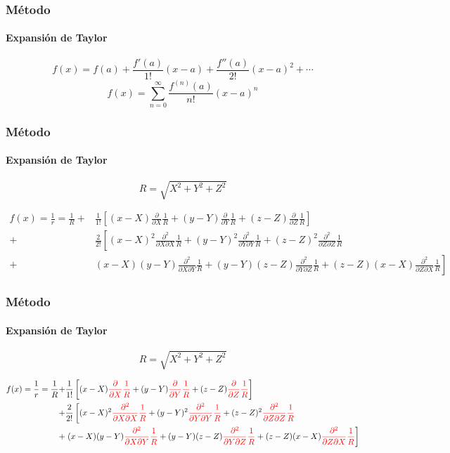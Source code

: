 \begin{frame}
    \frametitle{Método}
    \framesubtitle{Expansión de Taylor}

    $$f(x) = f(a) + \frac{f'(a)}{1!} (x-a)+\frac{f''(a)}{2!} (x-a)^{2} + \cdots$$
    $$f(x) = \sum_{n=0}^{\infty} \frac{f^{(n)}(a)}{n!} (x-a)^{n}$$
    
\end{frame}

\begin{frame}
    \frametitle{Método}
    \framesubtitle{Expansión de Taylor}
    \tiny
    $$R = \sqrt{X^{2} + Y^{2} + Z^{2}}$$

    \begin{equation}
    \begin{split}
    f(x) = \frac{1}{r} = \frac{1}{R} +& \frac{1}{1!} \left[ (x-X)\frac{\partial}{\partial X} \frac{1}{R} + (y-Y)\frac{\partial}{\partial Y} \frac{1}{R} +(z-Z)\frac{\partial}{\partial Z} \frac{1}{R} \right] \\
                                     +& \frac{2}{2!} \left[ (x-X)^{2}\frac{\partial^{2}}{\partial X \partial X} \frac{1}{R} + (y-Y)^{2}\frac{\partial^{2}}{\partial Y\partial Y} \frac{1}{R} +(z-Z)^{2}\frac{\partial^{2}}{\partial Z\partial Z} \frac{1}{R} \right. \nonumber \\
                                     +& \left.(x-X)(y-Y) \frac{\partial^{2}}{\partial X \partial Y} \frac{1}{R} + (y-Y)(z-Z)\frac{\partial^{2}}{\partial Y\partial Z} \frac{1}{R} + (z-Z)(x-X)\frac{\partial^{2}}{\partial Z \partial X} \frac{1}{R} \right]
    \end{split}
    \end{equation}
\end{frame}

\begin{frame}
    \frametitle{Método}
    \framesubtitle{Expansión de Taylor}
    \tiny
    $$R = \sqrt{X^{2} + Y^{2} + Z^{2}}$$

    \begin{equation}
    \begin{split}
    f(x) = \frac{1}{r} = \frac{1}{R} +& \frac{1}{1!} \left[ (x-X)\textcolor{red}{\frac{\partial}{\partial X} \frac{1}{R}} + (y-Y)\textcolor{red}{\frac{\partial}{\partial Y} \frac{1}{R}} +(z-Z)\textcolor{red}{\frac{\partial}{\partial Z} \frac{1}{R}} \right] \\
                                     +& \frac{2}{2!} \left[ (x-X)^{2}\textcolor{red}{\frac{\partial^{2}}{\partial X \partial X} \frac{1}{R}} + (y-Y)^{2}\textcolor{red}{\frac{\partial^{2}}{\partial Y\partial Y} \frac{1}{R}} +(z-Z)^{2}\textcolor{red}{\frac{\partial^{2}}{\partial Z\partial Z} \frac{1}{R}} \right. \nonumber \\
                                     +& \left.(x-X)(y-Y) \textcolor{red}{\frac{\partial^{2}}{\partial X \partial Y} \frac{1}{R}} + (y-Y)(z-Z)\textcolor{red}{\frac{\partial^{2}}{\partial Y\partial Z} \frac{1}{R}} + (z-Z)(x-X)\textcolor{red}{\frac{\partial^{2}}{\partial Z \partial X} \frac{1}{R}} \right]
    \end{split}
    \end{equation}
\end{frame}


